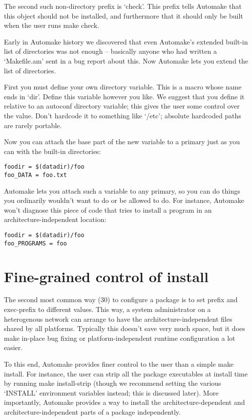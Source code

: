 The second such non-directory prefix is `check'. This prefix tells Automake that this object should not be installed, and furthermore that it should only be built when the user runs make check.

Early in Automake history we discovered that even Automake's extended built-in list of directories was not enough -- basically anyone who had written a `Makefile.am' sent in a bug report about this. Now Automake lets you extend the list of directories.

First you must define your own directory variable. This is a macro whose name ends in `dir'. Define this variable however you like. We suggest that you define it relative to an autoconf directory variable; this gives the user some control over the value. Don't hardcode it to something like `/etc'; absolute hardcoded paths are rarely portable.

Now you can attach the base part of the new variable to a primary just as you can with the built-in directories: 

\begin{Verbatim}[frame=single]
foodir = $(datadir)/foo
foo_DATA = foo.txt
\end{Verbatim}

Automake lets you attach such a variable to any primary, so you can do things 
you ordinarily wouldn't want to do or be allowed to do. For instance, Automake 
won't diagnose this piece of code that tries to install a program in an 
architecture-independent location:

\begin{Verbatim}[frame=single]
foodir = $(datadir)/foo
foo_PROGRAMS = foo
\end{Verbatim}

\section{Fine-grained control of install}

The second most common way (30) to configure a package is to set prefix and exec-prefix to different values. This way, a system administrator on a heterogenous network can arrange to have the architecture-independent files shared by all platforms. Typically this doesn't save very much space, but it does make in-place bug fixing or platform-independent runtime configuration a lot easier.

To this end, Automake provides finer control to the user than a simple make install. For instance, the user can strip all the package executables at install time by running make install-strip (though we recommend setting the various `INSTALL' environment variables instead; this is discussed later). More importantly, Automake provides a way to install the architecture-dependent and architecture-independent parts of a package independently.

